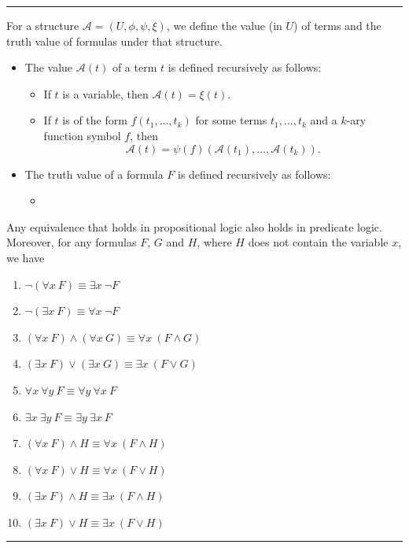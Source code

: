 \documentclass[a4paper]{extarticle}
\newcommand{\cA}{\mathcal{A}}
\newcommand{\sep}{\vspace{5pt}\noindent\hrule\vspace{5pt}}
\begin{document}
\begin{multicols*}{2}
\sep

\Def[Semantics] For a structure $\cA=(U,\phi,\psi,\xi)$, we define the value
(in $U$) of terms and the truth value of formulas under that structure.
\begin{itemize}
  \item The value $\cA(t)$ of a term $t$ is defined recursively as follows:
  \begin{itemize}
    \item If $t$ is a variable, then $\cA(t)=\xi(t)$.
    \item If $t$ is of the form $f(t_1,\ldots,t_k)$ for some terms
    $t_1,\ldots,t_k$ and a $k$-ary function symbol $f$, then
    \[\cA(t)=\psi(f)(\cA(t_1), \ldots,\cA(t_k)).\]
  \end{itemize}
  \item The truth value of a formula $F$ is defined recursively as follows:
  \begin{itemize}
    \item 
  \end{itemize}
\end{itemize}

\Lem Any equivalence that holds in propositional logic also holds in predicate
logic. Moreover, for any formulas $F$, $G$ and $H$, where $H$ does not contain
the variable $x$, we have
\begin{enumerate}[label=\arabic*)]
  \item $\lnot(\forall x \ F)\equiv \exists x\ \lnot F$
  \item $\lnot(\exists x \ F)\equiv \forall x \ \lnot F$
  \item $(\forall x \ F)\land (\forall x \ G)\equiv \forall x \ (F\land G)$
  \item $(\exists x \ F)\lor (\exists x \ G)\equiv \exists x \ (F\lor G)$
  \item $\forall x \ \forall y \ F \equiv \forall y \ \forall x  \ F$
  \item $\exists x \ \exists y \ F \equiv \exists y \ \exists x  \ F$
  \item $(\forall x \ F)\land H \equiv \forall x \ (F\land H)$
  \item $(\forall x \ F)\lor H \equiv \forall x \ (F\lor H)$
  \item $(\exists x \ F)\land H \equiv \exists x \ (F\land H)$
  \item $(\exists x \ F)\lor H \equiv \exists x \ (F\lor H)$
\end{enumerate}

\sep


\end{multicols*}
\end{document}
